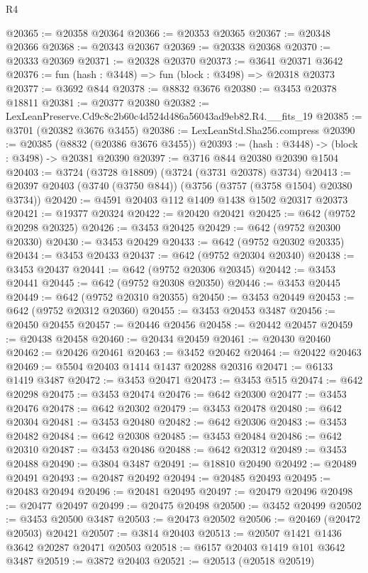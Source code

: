 \begin{lexlean}{R4}
\begin{coremodule}
@20365 := @20358 @20364
@20366 := @20353 @20365
@20367 := @20348 @20366
@20368 := @20343 @20367
@20369 := @20338 @20368
@20370 := @20333 @20369
@20371 := @20328 @20370
@20373 := @3641 @20371 @3642
@20376 := fun (hash : @3448) => fun (block : @3498) => @20318 @20373
@20377 := @3692 @844
@20378 := @8832 @3676
@20380 := @3453 @20378 @18811
@20381 := @20377 @20380
@20382 := LexLeanPreserve.Cd9c8c2b60c4d524d486a56043ad9eb82.R4.__fits_19
@20385 := @3701 (@20382 @3676 @3455)
@20386 := LexLeanStd.Sha256.compress
@20390 := @20385 (@8832 (@20386 @3676 @3455))
@20393 := (hash : @3448) -> (block : @3498) -> @20381 @20390
@20397 := @3716 @844 @20380 @20390 @1504
@20403 := @3724 (@3728 @18809) (@3724 (@3731 @20378) @3734)
@20413 := @20397 @20403 (@3740 (@3750 @844)) (@3756 (@3757 (@3758 @1504) @20380 @3734))
@20420 := @4591 @20403 @112 @1409 @1438 @1502 @20317 @20373
@20421 := @19377 @20324
@20422 := @20420 @20421
@20425 := @642 (@9752 @20298 @20325)
@20426 := @3453 @20425
@20429 := @642 (@9752 @20300 @20330)
@20430 := @3453 @20429
@20433 := @642 (@9752 @20302 @20335)
@20434 := @3453 @20433
@20437 := @642 (@9752 @20304 @20340)
@20438 := @3453 @20437
@20441 := @642 (@9752 @20306 @20345)
@20442 := @3453 @20441
@20445 := @642 (@9752 @20308 @20350)
@20446 := @3453 @20445
@20449 := @642 (@9752 @20310 @20355)
@20450 := @3453 @20449
@20453 := @642 (@9752 @20312 @20360)
@20455 := @3453 @20453 @3487
@20456 := @20450 @20455
@20457 := @20446 @20456
@20458 := @20442 @20457
@20459 := @20438 @20458
@20460 := @20434 @20459
@20461 := @20430 @20460
@20462 := @20426 @20461
@20463 := @3452 @20462
@20464 := @20422 @20463
@20469 := @5504 @20403 @1414 @1437 @20288 @20316
@20471 := @6133 @1419 @3487
@20472 := @3453 @20471
@20473 := @3453 @515
@20474 := @642 @20298
@20475 := @3453 @20474
@20476 := @642 @20300
@20477 := @3453 @20476
@20478 := @642 @20302
@20479 := @3453 @20478
@20480 := @642 @20304
@20481 := @3453 @20480
@20482 := @642 @20306
@20483 := @3453 @20482
@20484 := @642 @20308
@20485 := @3453 @20484
@20486 := @642 @20310
@20487 := @3453 @20486
@20488 := @642 @20312
@20489 := @3453 @20488
@20490 := @3804 @3487
@20491 := @18810 @20490
@20492 := @20489 @20491
@20493 := @20487 @20492
@20494 := @20485 @20493
@20495 := @20483 @20494
@20496 := @20481 @20495
@20497 := @20479 @20496
@20498 := @20477 @20497
@20499 := @20475 @20498
@20500 := @3452 @20499
@20502 := @3453 @20500 @3487
@20503 := @20473 @20502
@20506 := @20469 (@20472 @20503) @20421
@20507 := @3814 @20403
@20513 := @20507 @1421 @1436 @3642 @20287 @20471 @20503
@20518 := @6157 @20403 @1419 @101 @3642 @3487
@20519 := @3872 @20403
@20521 := @20513 (@20518 @20519)

\end{coremodule}
\end{lexlean}

